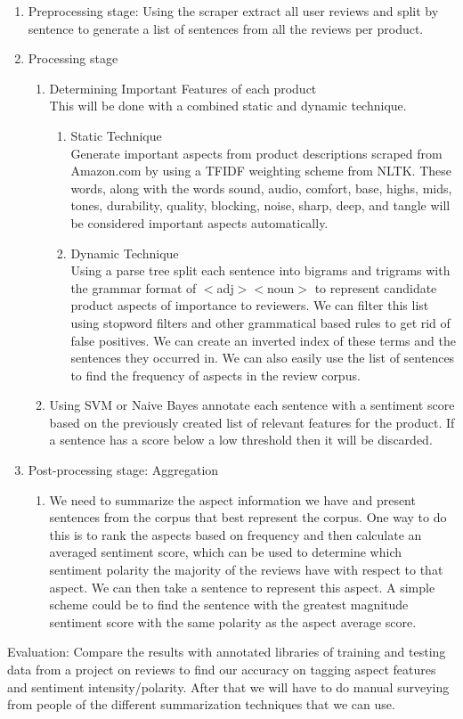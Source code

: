 \documentclass{article}
\begin{document}
\begin{enumerate}
\item Preprocessing stage: 
\newline Using the scraper extract all user reviews and split by sentence to generate a list of sentences from all the reviews per product.

\item Processing stage
	\begin{enumerate} [label* = \arabic*.]
	\item Determining Important Features of each product \\
	This will be done with a combined static and dynamic technique.
		\begin{enumerate} [label* = \arabic*.]
	\item Static Technique \\
	 Generate important aspects from product descriptions scraped from Amazon.com by using a TFIDF weighting scheme from NLTK. These words, along with the words sound, audio, comfort, base, highs, mids, tones, durability, quality, blocking, noise, sharp, deep, and tangle will be considered important aspects automatically.
	\item Dynamic Technique \\
	 Using a parse tree split each sentence into bigrams and trigrams with the grammar format of $<$adj$><$noun$>$ to represent candidate product aspects of importance to reviewers. We can filter this list using stopword filters and other grammatical based rules to get rid of false positives. We can create an inverted index of these terms and the sentences they occurred in. We can also easily use the list of sentences to find the frequency of aspects in the review corpus.
	\end{enumerate}
		\item Using SVM or Naive Bayes annotate each sentence with a sentiment score based on the previously created list of relevant features for the product. If a sentence has a score below a low threshold then it will be discarded.
	\end{enumerate}
\item Post-processing stage: Aggregation
	\begin{enumerate}[label* = \arabic*.]
	\item We need to summarize the aspect information we have and present sentences from the corpus that best represent the corpus. One way to do this is to rank the aspects based on frequency and then calculate an averaged sentiment score, which can be used to determine which sentiment polarity the majority of the reviews have with respect to that aspect. We can then take a sentence to represent this aspect. A simple scheme could be to find the sentence with the greatest magnitude sentiment score with the same polarity as the aspect average score.
	\end{enumerate}
\end{enumerate}
Evaluation: Compare the results with annotated libraries of training and testing data from a project on reviews to find our accuracy on tagging aspect features and sentiment intensity/polarity.
After that we will have to do manual surveying from people of the different summarization techniques that we can use.
\end{document}
